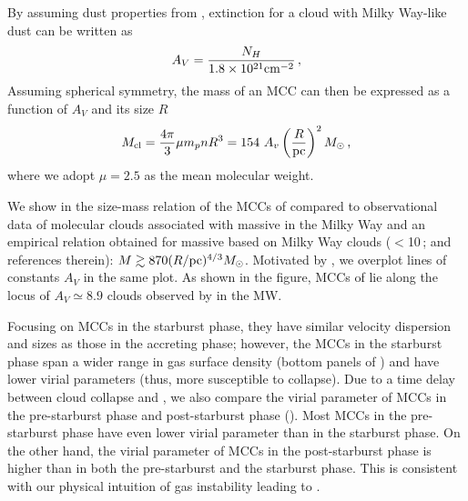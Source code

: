 \IfFileExists{emulateapjlegacy.cls}{\documentclass[iop]{emulateapjlegacy}}{\documentclass[iop]{emulateapj}}
\begin{document}
By assuming dust properties from \citet[][]{weingartner:2001}, extinction for a cloud with Milky Way-like dust can be written as 
\begin{equation}
A_V = \frac{N_H}{1.8 \times 10^{21} {\rm cm}^{-2}}\,,
\end{equation}
Assuming spherical symmetry, the mass of an MCC can then be expressed as a function of $A_V$ and its size $R$
\begin{equation}\label{eqn:constantcolumndensity}
M_{\rm cl} = \frac{4\pi}{3} \mu m_p n R^3 = 154~A_v \left(\frac{R}{\rm pc}\right)^2 \Msun \,,
\end{equation}
where we adopt $\mu = 2.5$ as the mean molecular weight.  

We show in  the size-mass relation of the MCCs of \flower compared to observational data of molecular clouds associated with massive \SF in the 
Milky Way \citep{Beuther02a, Mueller02a, Hill05a, Motte07a} and an empirical relation obtained for massive \SF based on Milky Way clouds ($<$10\,\Msun; \citealt{Kauffmann10b, Kauffmann10c} and references therein): $M \gtrsim 870(R/{\rm pc})^{4/3} M_\odot$.
Motivated by \obs, we overplot lines of constants $A_V$ in the same plot.
As shown in the figure, MCCs of \flower lie along the locus of $A_V \simeq 8.9$ clouds observed by
\citet{Lombardi10a} in the MW. 
%

Focusing on MCCs in the starburst phase, they have similar velocity dispersion and sizes 
as those in the accreting phase; however, the MCCs in the starburst phase span 
a wider range in gas surface density (bottom panels of ) and have lower virial parameters (thus, more susceptible to collapse).
Due to a time delay between cloud collapse and \SF, we also compare the virial parameter of MCCs in the pre-starburst phase and post-starburst phase
().
Most MCCs in the pre-starburst phase have even lower virial parameter than in the starburst phase. On the other hand, 
the virial parameter of MCCs in the post-starburst phase is higher than in both the pre-starburst and the starburst phase. 
This is consistent with our physical intuition of gas instability leading to \SF.
\end{document}

